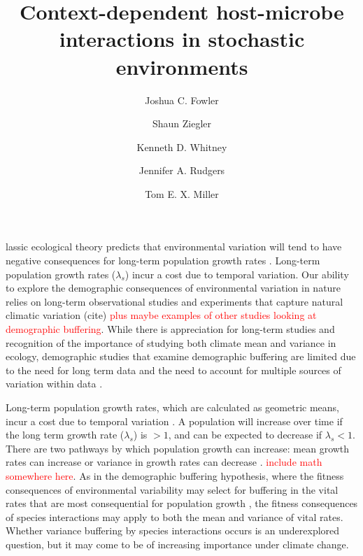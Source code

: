 \documentclass[9pt,twocolumn,twoside,lineno]{pnas-new}
\title{Context-dependent host-microbe interactions in stochastic environments}
\author[a,1]{Joshua C. Fowler}
\author[b]{Shaun Ziegler}
\author[b]{Kenneth D. Whitney}
\author[b]{Jennifer A. Rudgers}
\author[a]{Tom E. X. Miller}
\affil[a]{Rice University, Department of BioSciences, Houston, TX, 77005}
\affil[b]{University of New Mexico, Department of Biology, Albuquerque, NM, 87131}
\begin{document}


\maketitle
\thispagestyle{firststyle}

lassic ecological theory predicts that environmental variation will tend to have negative consequences for long-term population growth rates \cite{lewontin_population_1969,tuljapurkar_population_1982}. Long-term population growth rates ($\lambda_s$) incur  a cost due to temporal variation. Our ability to explore the demographic consequences of environmental variation in nature relies on long-term observational studies and experiments that capture natural climatic variation (cite) \textcolor{red}{plus maybe examples of other studies looking at demographic buffering}. While there is appreciation for long-term studies and recognition of the importance of studying both climate mean and variance in ecology, demographic studies that examine demographic buffering are limited due to the need for long term data and the need to account for multiple sources of variation within data \cite{hilde_demographic_2020}.

Long-term population growth rates, which are calculated as geometric means, incur a cost due to temporal variation \cite{lewontin_population_1969,tuljapurkar_population_1982}. A population will increase over time if the long term growth rate ($\lambda_s$) is $>1$, and can be expected to decrease if $\lambda_s<1$. There are two pathways by which population growth can increase: mean growth rates can increase or variance in growth rates can decrease \cite{}. \textcolor{red}{include math somewhere here}. As in the demographic buffering hypothesis, where the fitness consequences of environmental variability may select for buffering in the vital rates that are most consequential for population growth \cite{pfister1998patterns}, the fitness consequences of species interactions may apply to both the mean and variance of vital rates. Whether variance buffering by species interactions occurs is an underexplored question, but it may come to be of increasing importance under climate change.
\end{document}
